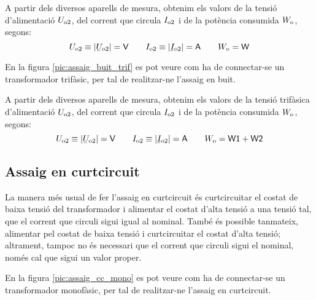 A partir dels diversos aparells de mesura, obtenim els valors de la
tensió d'alimentació $U_\mathrm{o2}$, del corrent que circula
$I_\mathrm{o2}$ i de la potència consumida $W_\mathrm{o}$, segons:
\begin{equation}
    U\ped{o2}\equiv|\cmplx{U}\ped{o2}|=\textsf{V} \qquad
    I\ped{o2}\equiv|\cmplx{I}\ped{o2}|=\textsf{A}
    \qquad W\ped{o}=\textsf{W}
\end{equation}

En la figura \vref{pic:assaig_buit_trif} es pot veure com ha de
connectar-se un transformador trifàsic, per tal de realitzar-ne l'assaig en buit.

\begin{center}
    
    \label{pic:assaig_buit_trif}
\end{center}


A partir dels diversos aparells de mesura, obtenim els valors de la
tensió trifàsica d'alimentació $U_\mathrm{o2}$, del corrent que circula
$I_\mathrm{o2}$ i de la potència consumida $W_\mathrm{o}$, segons:
\begin{equation}
    U\ped{o2}\equiv|\cmplx{U}\ped{o2}|=\textsf{V} \qquad
    I\ped{o2}\equiv|\cmplx{I}\ped{o2}|=\textsf{A} \qquad
    W\ped{o}=\textsf{W1}+\textsf{W2}
\end{equation}

\subsection{Assaig en curtcircuit}

La manera més usual de fer l'assaig en curtcircuit és
curtcircuitar el costat de baixa tensió del transformador i
alimentar el costat d'alta tensió a  una tensió tal, que el corrent
que circuli sigui igual al nominal. També és possible tanmateix,
alimentar pel costat de baixa tensió i curtcircuitar el costat
d'alta tensió; altrament, tampoc no és necessari que el corrent
que circuli sigui el nominal, només cal que sigui un valor proper.

En la figura \vref{pic:assaig_cc_mono} es pot veure com ha de
connectar-se un transformador monofàsic, per tal de realitzar-ne l'assaig en curtcircuit.

\break
\begin{center}
    
    \label{pic:assaig_cc_mono} \
\end{center}

